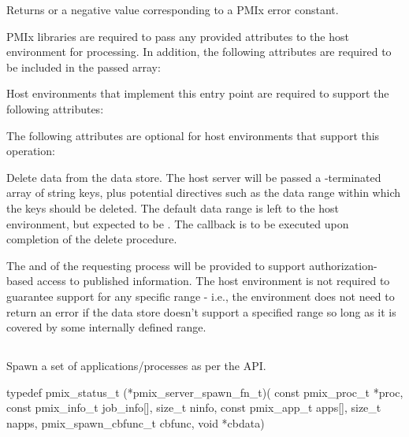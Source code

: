 Returns  or a negative value corresponding to a PMIx error constant.

\reqattrstart
\ac{PMIx} libraries are required to pass any provided attributes to the host environment for processing. In addition, the following attributes are required to be included in the passed  array:


Host environments that implement this entry point are required to support the following attributes:


\reqattrend

\optattrstart
The following attributes are optional for host environments that support this operation:


\optattrend

\descr

Delete data from the data store.
The host server will be passed a -terminated array of string keys, plus potential directives such as the data range within which the keys should be deleted. The default data range is left to the host environment, but expected to be .
The callback is to be executed upon completion of the delete procedure.

\advicermstart
The  and  of the requesting process will be provided to support authorization-based access to published information. The host environment is not required to guarantee support for any specific range - i.e., the environment does not need to return an error if the data store doesn't support a specified range so long as it is covered by some internally defined range.
\advicermend


\subsection{}

\summary

Spawn a set of applications/processes as per the  API.

\format

\cspecificstart
\begin{codepar}
typedef pmix_status_t (*pmix_server_spawn_fn_t)(
                             const pmix_proc_t *proc,
                             const pmix_info_t job_info[],
                             size_t ninfo,
                             const pmix_app_t apps[],
                             size_t napps,
                             pmix_spawn_cbfunc_t cbfunc,
                             void *cbdata)
\end{codepar}
\cspecificend

